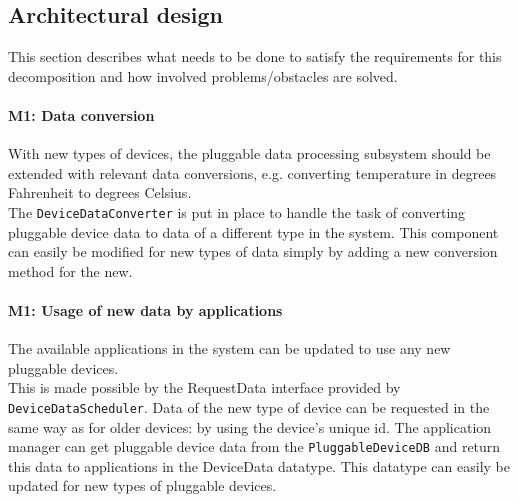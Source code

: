 \subsection{Architectural design}
    This section describes what needs to be done to satisfy the requirements for
    this decomposition and how involved problems/obstacles are solved.

    \paragraph{M1: Data conversion}
        With new types of devices, the pluggable data processing subsystem
        should be extended with relevant data conversions,
        e.g. converting temperature in degrees Fahrenheit to degrees Celsius. \\
        The \texttt{DeviceDataConverter} is put in place to handle the
        task of converting pluggable device data to data of a different type in the system.
        This component can easily be modified for new types of data simply by
        adding a new conversion method for the new.

    \paragraph{M1: Usage of new data by applications}
        The available applications in the system can be updated to use any
        new pluggable devices. \\
        This is made possible by the RequestData
        interface provided by \texttt{DeviceDataScheduler}.
        Data of the new type of device can be requested in the same way
        as for older devices: by using the device's unique id.
        The application manager can get pluggable device data from the
        \texttt{PluggableDeviceDB} and return this data to applications in
        the DeviceData datatype. This datatype can easily be
        updated for new types of pluggable devices.

